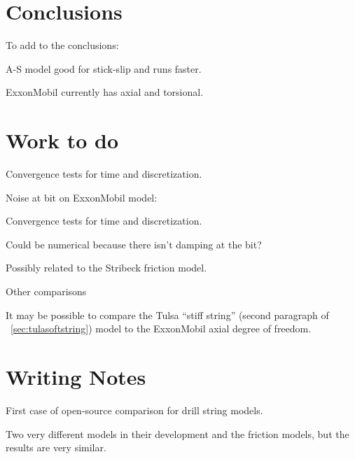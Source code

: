 \section{Conclusions}
To add to the conclusions:
\begin{bulletedlist}
	\item A-S model good for stick-slip and runs faster.
	\item ExxonMobil currently has axial and torsional.
\end{bulletedlist}

\section{Work to do}
\begin{bulletedlist}
	\item Convergence tests for time and discretization.
\end{bulletedlist}

\noindent Noise at bit on ExxonMobil model:
\begin{bulletedlist}
	\item Convergence tests for time and discretization.
	\item Could be numerical because there isn't damping at the bit?
	\item Possibly related to the Stribeck friction model.
\end{bulletedlist}

\noindent Other comparisons
\begin{bulletedlist}
	\item It may be possible to compare the Tulsa ``stiff string'' (second paragraph of \sectionname~\ref{sec:tulasoftstring}) model to the ExxonMobil axial degree of freedom.
\end{bulletedlist}

\section{Writing Notes}
\begin{bulletedlist}
	\item First case of open-source comparison for drill string models.
	\item Two very different models in their development and the friction models, but the results are very similar.
\end{bulletedlist}




